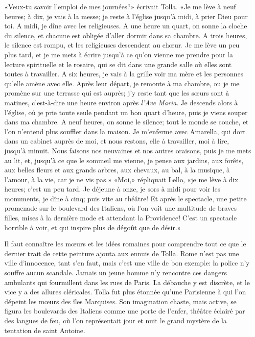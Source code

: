 «Veux-tu savoir l'emploi de mes journées?» écrivait Tolla. «Je me lève à neuf heures; à dix, je vais à la messe; je reste à l'église jusqu'à midi, à prier Dieu pour toi. A midi, je dîne avec les religieuses. A une heure un quart, on sonne la cloche du silence, et chacune est obligée d'aller dormir dans sa chambre. A trois heures, le silence est rompu, et les religieuses descendent au ch\oe{}ur. Je me lève un peu plus tard, et je me mets à écrire jusqu'à ce qu'on vienne me prendre pour la lecture spirituelle et le rosaire, qui se dit dans une grande salle où elles sont toutes à travailler. A six heures, je vais à la grille voir ma mère et les personnes qu'elle amène avec elle. Après leur départ, je remonte à ma chambre, ou je me promène sur une terrasse qui est auprès; j'y reste tant que les s\oe{}urs sont à matines, c'est-à-dire une heure environ après \emph{l'Ave Maria.} Je descends alors à l'église, où je prie toute seule pendant un bon quart d'heure, puis je viens souper dans ma chambre. A neuf heures, on sonne le silence; tout le monde se couche, et l'on n'entend plus souffler dans la maison. Je m'enferme avec Amarella, qui dort dans un cabinet auprès de moi, et nous restons, elle à travailler, moi à lire, jusqu'à minuit. Nous faisons nos neuvaines et nos autres oraisons, puis je me mets au lit, et, jusqu'à ce que le sommeil me vienne, je pense aux jardins, aux forêts, aux belles fleurs et aux grands arbres, aux chevaux, au bal, à la musique, à l'amour, à la vie, car je ne vis pas.» «Moi,» répliquait Lello, «je me lève à dix heures; c'est un peu tard. Je déjeune à onze, je sors à midi pour voir les monuments, je dîne à cinq; puis vite au théâtre! Et après le spectacle, une petite promenade sur le boulevard des Italiens, où l'on voit une multitude de braves filles, mises à la dernière mode et attendant la Providence! C'est un spectacle horrible à voir, et qui inspire plus de dégoût que de désir.»

Il faut connaître les m\oe{}urs et les idées romaines pour comprendre tout ce que le dernier trait de cette peinture ajouta aux ennuis de Tolla. Rome n'est pas une ville d'innocence, tant s'en faut, mais c'est une ville de bon exemple: la police n'y souffre aucun scandale. Jamais un jeune homme n'y rencontre ces dangers ambulants qui fourmillent dans les rues de Paris. La débauche y est discrète, et le vice y a des allures cléricales. Tolla fut plus étonnée qu'une Parisienne à qui l'on dépeint les m\oe{}urs des îles Marquises. Son imagination chaste, mais active, se figura les boulevards des Italiens comme une porte de l'enfer, théâtre éclairé par des langues de feu, où l'on représentait jour et nuit le grand mystère de la tentation de saint Antoine.

